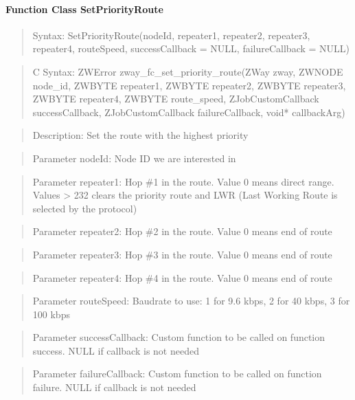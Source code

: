 \paragraph{Function Class SetPriorityRoute}
\begin{quote}Syntax: SetPriorityRoute(nodeId, repeater1, repeater2, repeater3, repeater4, routeSpeed, successCallback = NULL, failureCallback = NULL)\end{quote}
\begin{quote}C Syntax: ZWError zway\_fc\_set\_priority\_route(ZWay zway, ZWNODE node\_id, ZWBYTE repeater1, ZWBYTE repeater2, ZWBYTE repeater3, ZWBYTE repeater4, ZWBYTE route\_speed, ZJobCustomCallback successCallback, ZJobCustomCallback failureCallback, void* callbackArg)\end{quote}
\begin{quote}Description: Set the route with the highest priority\end{quote}
\begin{quote}Parameter nodeId: Node ID we are interested in\end{quote}
\begin{quote}Parameter repeater1: Hop \#1 in the route. Value 0 means direct range. Values > 232 clears the priority route and LWR (Last Working Route is selected by the protocol)\end{quote}
\begin{quote}Parameter repeater2: Hop \#2 in the route. Value 0 means end of route\end{quote}
\begin{quote}Parameter repeater3: Hop \#3 in the route. Value 0 means end of route\end{quote}
\begin{quote}Parameter repeater4: Hop \#4 in the route. Value 0 means end of route\end{quote}
\begin{quote}Parameter routeSpeed: Baudrate to use: 1 for 9.6 kbps, 2 for 40 kbps, 3 for 100 kbps\end{quote}
\begin{quote}Parameter successCallback: Custom function to be called on function success. NULL if callback is not needed\end{quote}
\begin{quote}Parameter failureCallback: Custom function to be called on function failure. NULL if callback is not needed\end{quote}



